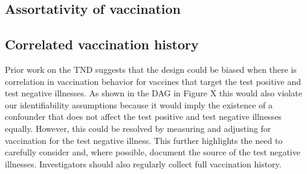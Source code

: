 \begin{appendix}
    \subsection{Assortativity of vaccination}

    \subsection{Correlated vaccination history}
    Prior work on the TND suggests that the design could be biased when there is correlation in vaccination behavior for vaccines that target the test positive and test negative illnesses. As shown in the DAG in Figure X this would also violate our identifiability assumptions because it would imply the existence of a confounder that does not affect the test positive and test negative illnesses equally. However, this could be resolved by measuring and adjusting for vaccination for the test negative illness. This further highlights the need to carefully consider and, where possible, document the source of the test negative illnesses. Investigators should also regularly collect full vaccination history.


    \begin{figure}[p]
    \centering
    \begin{subfigure}{0.8\linewidth}
        \centering
\end{subfigure}
\end{figure}
\end{appendix}

